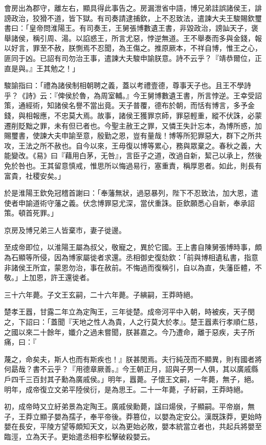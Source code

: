 \begin{pinyinscope}
會房出為郡守，離左右，顯具得此事告之。房漏泄省中語，博兄弟詿誤諸侯王，誹謗政治，狡猾不道，皆下獄。有司奏請逮捕欽，上不忍致法，遣諫大夫王駿賜欽璽書曰：「皇帝問淮陽王。有司奏王，王舅張博數遺王書，非毀政治，謗訕天子，褒舉諸侯，稱引周、湯。以諂惑王，所言尤惡，悖逆無道。王不舉奏而多與金錢，報以好言，罪至不赦，朕惻焉不忍聞，為王傷之。推原厥本，不祥自博，惟王之心，匪同于凶。已詔有司勿治王事，遣諫大夫駿申諭朕意。詩不云乎？『靖恭爾位，正直是與。』王其勉之！」

駿諭指曰：「禮為諸侯制相朝聘之義，蓋以考禮壹德，尊事天子也。且王不學詩乎？《詩》云：『俾侯於魯，為周室輔。』今王舅博數遺王書，所言悖逆。王幸受詔策，通經術，知諸侯名譽不當出竟。天子普覆，德布於朝，而恬有博言，多予金錢，與相報應，不忠莫大焉。故事，諸侯王獲罪京師，罪惡輕重，縱不伏誅，必蒙遷削貶黜之罪，未有但已者也。今聖主赦王之罪，又憐王失計忘本，為博所惑，加賜璽書，使諫大夫申諭至意，殷勤之恩，豈有量哉！博等所犯罪惡大，群下之所共攻，王法之所不赦也。自今以來，王毋復以博等累心，務與眾棄之。春秋之義，大能變改。《易》曰『藉用白茅，无咎』，言臣子之道，改過自新，絜己以承上，然後免於咎也。王其留意慎戒，惟思所以悔過易行，塞重責，稱厚恩者。如此，則長有富貴，社稷安矣。」

於是淮陽王欽免冠稽首謝曰：「奉藩無狀，過惡暴列，陛下不忍致法，加大恩，遣使者申諭道術守藩之義。伏念博罪惡尤深，當伏重誅。臣欽願悉心自新，奉承詔策。頓首死罪。」

京房及博兄弟三人皆棄市，妻子徙邊。

至成帝即位，以淮陽王屬為叔父，敬寵之，異於它國。王上書自陳舅張博時事，頗為石顯等所侵，因為博家屬徙者求還。丞相御史復劾欽：「前與博相遺私書，指意非諸侯王所宜，蒙恩勿治，事在赦前。不悔過而復稱引，自以為直，失藩臣體，不敬。」上加恩，許王還徙者。

三十六年薨。子文王玄嗣，二十六年薨。子縯嗣，王莽時絕。

楚孝王囂，甘露二年立為定陶王，三年徙楚。成帝河平中入朝，時被疾，天子閔之，下詔曰：「蓋聞『天地之性人為貴，人之行莫大於孝』。楚王囂素行孝順仁慈，之國以來二十餘年，孅介之過未嘗聞，朕甚嘉之。今乃遭命，離于惡疾，夫子所痛，曰：『

蔑之，命矣夫，斯人也而有斯疾也！』朕甚閔焉。夫行純茂而不顯異，則有國者將何勗哉？書不云乎？『用德章厥善。』今王朝正月，詔與子男一人俱，其以廣戚縣戶四千三百封其子勳為廣戚侯。」明年，囂薨。子懷王文嗣，一年薨，無子，絕。明年，成帝復立文弟平陸侯衍，是為思王。二十一年薨，子紆嗣，王莽時絕。

初，成帝時又立紆弟景為定陶王。廣戚侯勳薨，諡曰煬侯，子顯嗣。平帝崩，無子，王莽立顯子嬰為孺子，奉平帝後。莽篡位，以嬰為定安公。漢既誅莽，更始時嬰在長安，平陵方望等頗知天文，以為更始必敗，嬰本統當立者也，共起兵將嬰至臨涇，立為天子。更始遣丞相李松擊破殺嬰云。


\end{pinyinscope}
